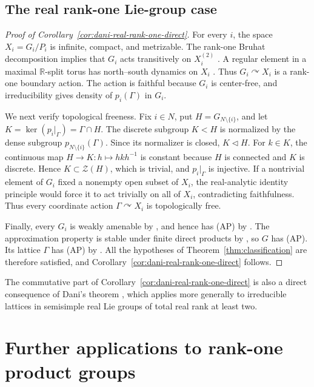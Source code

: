 \documentclass[11pt]{amsart}
\numberwithin{equation}{section}
\newcommand{\R}{\mathbb{R}}
\theoremstyle{definition}
\begin{document}
	\subsection{The real rank-one Lie-group case}
	
	\begin{proof}[Proof of Corollary~\ref{cor:dani-real-rank-one-direct}]
		For every $i$, the space $X_i=G_i/P_i$ is infinite, compact, and metrizable.
		The rank-one Bruhat decomposition implies that $G_i$ acts transitively on
		$X_i^{(2)}$ \cite[Theorem~4.9]{Kn97}.  A regular element in a maximal
		$\R$-split torus has north--south dynamics on $X_i$
		\cite[Sections~3.3 and~3.5]{Be97}. Thus $G_i\curvearrowright X_i$ is a
		rank-one boundary action. The action is faithful because $G_i$ is
		center-free, and irreducibility gives density of $p_i(\Gamma)$ in $G_i$.
		
		We next verify topological freeness. Fix \(i\in N\), put
		\(H=G_{N\setminus\{i\}}\), and let \(K=\ker(p_i|_\Gamma)=\Gamma\cap H\).
		The discrete subgroup \(K<H\) is normalized by the dense subgroup
		\(p_{N\setminus\{i\}}(\Gamma)\). Since its normalizer is closed, \(K\lhd H\).
		For \(k\in K\), the continuous map \(H\to K:h\mapsto hkh^{-1}\) is constant
		because \(H\) is connected and \(K\) is discrete. Hence \(K\subset\mathcal Z(H)\),
		which is trivial, and \(p_i|_\Gamma\) is injective. If a nontrivial element of
		\(G_i\) fixed a nonempty open subset of \(X_i\), the real-analytic identity
		principle would force it to act trivially on all of \(X_i\), contradicting
		faithfulness. Thus every coordinate action \(\Gamma\curvearrowright X_i\) is
		topologically free.
		
		Finally, every \(G_i\) is weakly amenable by \cite[Main theorem]{CH89}, and
		hence has {\rm(AP)} by \cite[Theorem~1.12]{HK94}. The approximation property is
		stable under finite direct products by \cite[Theorem~1.15]{HK94}, so \(G\) has
		{\rm(AP)}. Its lattice \(\Gamma\) has
		{\rm(AP)} by \cite[Theorem~2.4]{HK94}. All the hypotheses of
		Theorem~\ref{thm:classification} are therefore satisfied, and
		Corollary~\ref{cor:dani-real-rank-one-direct} follows.
	\end{proof}
	
	The commutative part of Corollary~\ref{cor:dani-real-rank-one-direct} is also a direct consequence of Dani's
	theorem \cite[Theorem~A]{Da84}, which applies more generally to irreducible
	lattices in semisimple real Lie groups of total real rank at least two.
	
	\section{Further applications to rank-one product groups}
	\label{sec:applications}
	
\end{document}
